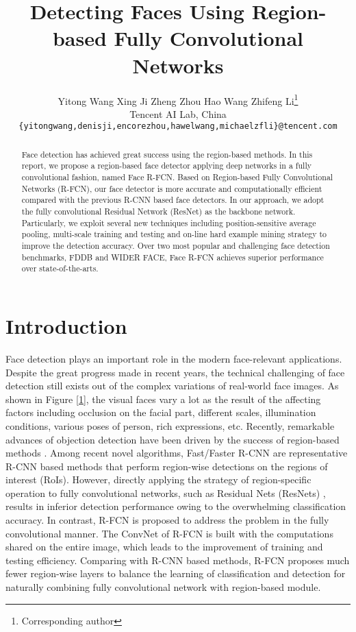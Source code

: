\documentclass{article} \usepackage{nips13submit_e,times}
\title{Detecting Faces Using Region-based Fully Convolutional Networks}
\author{
  Yitong Wang \quad Xing Ji \quad Zheng Zhou \quad Hao Wang \quad Zhifeng Li\thanks{Corresponding author}\\
  Tencent AI Lab, China\\
  \texttt{\{yitongwang,denisji,encorezhou,hawelwang,michaelzfli\}@tencent.com} \\
}
\begin{document}
\maketitle

\begin{abstract}

Face detection has achieved great success using the region-based methods.
In this report, we propose a region-based face detector applying deep networks in a fully convolutional fashion, named Face R-FCN. Based on Region-based Fully Convolutional Networks (R-FCN), our face detector is more accurate and computationally efficient compared with the previous R-CNN based face detectors. In our approach, we adopt the fully convolutional Residual Network (ResNet) as the backbone network. Particularly, we exploit several new techniques including position-sensitive average pooling, multi-scale training and testing and on-line hard example mining strategy to improve the detection accuracy. Over two most popular and challenging face detection benchmarks, FDDB and WIDER FACE, Face R-FCN achieves superior performance over state-of-the-arts.

\end{abstract}

\section{Introduction}
Face detection plays an important role in the modern face-relevant applications. Despite the great progress made in recent years, the technical challenging of face detection still exists out of the complex variations of real-world face images.
As shown in Figure \ref{1}, the visual faces vary a lot as the result of the affecting factors including occlusion on the facial part, different scales, illumination conditions, various poses of person, rich expressions, etc.
Recently, remarkable advances of objection detection have been driven by the success of region-based methods \cite{RCNNs,RCNN,FastRCNN,FasterRCNN}. Among recent novel algorithms, Fast/Faster R-CNN \cite{FastRCNN,FasterRCNN} are representative R-CNN based methods that perform region-wise detections on the regions of interest (RoIs). However, directly applying the strategy of region-specific operation to fully convolutional networks, such as Residual Nets (ResNets) \cite{ResNet101}, results in inferior detection performance owing to the overwhelming classification accuracy. In contrast, R-FCN \cite{RFCN} is proposed to address the problem in the fully convolutional manner.
The ConvNet of R-FCN is built with the computations shared on the entire image, which leads to the improvement of training and testing efficiency. Comparing with R-CNN based methods, R-FCN proposes much fewer region-wise layers to balance the learning of classification and detection for naturally combining fully convolutional network with region-based module.
\end{document}
